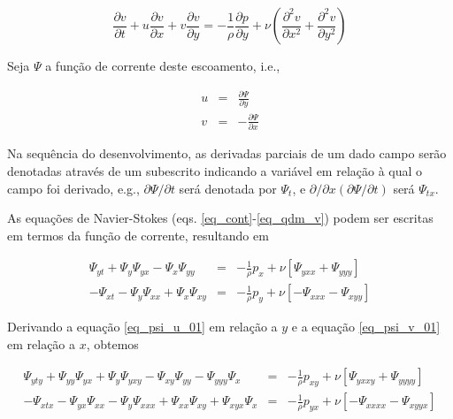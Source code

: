 \documentclass[a4paper,portuguese,10pt]{article}
\renewcommand{\D}{\partial}
\begin{document}
\begin{equation}
  \frac{\D v}{\D t}+u\frac{\D v}{\D x}+v\frac{\D v}{\D y}=-\frac{1}{\rho}\frac{\D p}{\D y}+\nu\left(\frac{\D^2v}{\D x^2}+\frac{\D^2v}{\D y^2}\right)
  \label{eq_qdm_v}
\end{equation}

Seja $\Psi$ a função de corrente deste escoamento, i.e.,

\begin{subequations}
  \begin{eqnarray}
    u &=& \frac{\D\Psi}{\D y}\\
    v &=& -\frac{\D\Psi}{\D x}
  \end{eqnarray}
\end{subequations}

Na sequência do desenvolvimento, as derivadas parciais de um dado campo serão denotadas através de um subescrito indicando a variável em relação à qual o campo foi derivado, e.g., $\D\Psi/\D t$ será denotada por $\Psi_t$, e $\D/\D x(\D\Psi/\D t)$ será $\Psi_{tx}$.

As equações de Navier-Stokes (eqs. \ref{eq_cont}-\ref{eq_qdm_v}) podem ser escritas em termos da função de corrente, resultando em

\begin{subequations}
  \begin{eqnarray}
    \label{eq_psi_u_01}
    \Psi_{yt}+\Psi_y\Psi_{yx}-\Psi_x\Psi_{yy}&=&-\frac{1}{\rho}p_x+\nu\left[\Psi_{yxx}+\Psi_{yyy}\right]\\
    \label{eq_psi_v_01}
    -\Psi_{xt}-\Psi_y\Psi_{xx}+\Psi_x\Psi_{xy}&=&-\frac{1}{\rho}p_y+\nu\left[-\Psi_{xxx}-\Psi_{xyy}\right]
  \end{eqnarray}
\end{subequations}

Derivando a equação \ref{eq_psi_u_01} em relação a $y$ e a equação \ref{eq_psi_v_01} em relação a $x$, obtemos

\begin{subequations}
  \begin{eqnarray}
    \label{eq_psi_u_02}
    \Psi_{yty}+\Psi_{yy}\Psi_{yx}+\Psi_{y}\Psi_{yxy}-\Psi_{xy}\Psi_{yy}-\Psi_{yyy}\Psi_{x}&=&-\frac{1}{\rho}p_{xy}+\nu\left[\Psi_{yxxy}+\Psi_{yyyy}\right]\\
    \label{eq_psi_v_02}
    -\Psi_{xtx}-\Psi_{yx}\Psi_{xx}-\Psi_{y}\Psi_{xxx}+\Psi_{xx}\Psi_{xy}+\Psi_{xyx}\Psi_{x}&=&-\frac{1}{\rho}p_{yx}+\nu\left[-\Psi_{xxxx}-\Psi_{xyyx}\right]
  \end{eqnarray}
\end{subequations}
\end{document}
